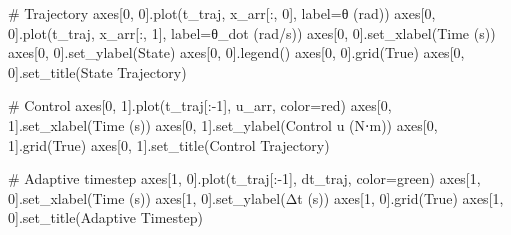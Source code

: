 \documentclass[
  letterpaper,
  DIV=11,
  numbers=noendperiod]{scrartcl}
\newenvironment{Shaded}{\begin{snugshade}}{\end{snugshade}}
\newcommand{\CommentTok}[1]{\textcolor[rgb]{0.37,0.37,0.37}{#1}}
\newcommand{\DecValTok}[1]{\textcolor[rgb]{0.68,0.00,0.00}{#1}}
\newcommand{\NormalTok}[1]{\textcolor[rgb]{0.00,0.23,0.31}{#1}}
\newcommand{\OperatorTok}[1]{\textcolor[rgb]{0.37,0.37,0.37}{#1}}
\newcommand{\StringTok}[1]{\textcolor[rgb]{0.13,0.47,0.30}{#1}}
\newcommand{\VariableTok}[1]{\textcolor[rgb]{0.07,0.07,0.07}{#1}}
\begin{document}
\begin{Shaded}
\begin{Highlighting}[]
    \CommentTok{\# Trajectory}
\NormalTok{    axes[}\DecValTok{0}\NormalTok{, }\DecValTok{0}\NormalTok{].plot(t\_traj, x\_arr[:, }\DecValTok{0}\NormalTok{], label}\OperatorTok{=}\StringTok{\textquotesingle{}θ (rad)\textquotesingle{}}\NormalTok{)}
\NormalTok{    axes[}\DecValTok{0}\NormalTok{, }\DecValTok{0}\NormalTok{].plot(t\_traj, x\_arr[:, }\DecValTok{1}\NormalTok{], label}\OperatorTok{=}\StringTok{\textquotesingle{}θ\_dot (rad/s)\textquotesingle{}}\NormalTok{)}
\NormalTok{    axes[}\DecValTok{0}\NormalTok{, }\DecValTok{0}\NormalTok{].set\_xlabel(}\StringTok{\textquotesingle{}Time (s)\textquotesingle{}}\NormalTok{)}
\NormalTok{    axes[}\DecValTok{0}\NormalTok{, }\DecValTok{0}\NormalTok{].set\_ylabel(}\StringTok{\textquotesingle{}State\textquotesingle{}}\NormalTok{)}
\NormalTok{    axes[}\DecValTok{0}\NormalTok{, }\DecValTok{0}\NormalTok{].legend()}
\NormalTok{    axes[}\DecValTok{0}\NormalTok{, }\DecValTok{0}\NormalTok{].grid(}\VariableTok{True}\NormalTok{)}
\NormalTok{    axes[}\DecValTok{0}\NormalTok{, }\DecValTok{0}\NormalTok{].set\_title(}\StringTok{\textquotesingle{}State Trajectory\textquotesingle{}}\NormalTok{)}

    \CommentTok{\# Control}
\NormalTok{    axes[}\DecValTok{0}\NormalTok{, }\DecValTok{1}\NormalTok{].plot(t\_traj[:}\OperatorTok{{-}}\DecValTok{1}\NormalTok{], u\_arr, color}\OperatorTok{=}\StringTok{\textquotesingle{}red\textquotesingle{}}\NormalTok{)}
\NormalTok{    axes[}\DecValTok{0}\NormalTok{, }\DecValTok{1}\NormalTok{].set\_xlabel(}\StringTok{\textquotesingle{}Time (s)\textquotesingle{}}\NormalTok{)}
\NormalTok{    axes[}\DecValTok{0}\NormalTok{, }\DecValTok{1}\NormalTok{].set\_ylabel(}\StringTok{\textquotesingle{}Control u (N⋅m)\textquotesingle{}}\NormalTok{)}
\NormalTok{    axes[}\DecValTok{0}\NormalTok{, }\DecValTok{1}\NormalTok{].grid(}\VariableTok{True}\NormalTok{)}
\NormalTok{    axes[}\DecValTok{0}\NormalTok{, }\DecValTok{1}\NormalTok{].set\_title(}\StringTok{\textquotesingle{}Control Trajectory\textquotesingle{}}\NormalTok{)}

    \CommentTok{\# Adaptive timestep}
\NormalTok{    axes[}\DecValTok{1}\NormalTok{, }\DecValTok{0}\NormalTok{].plot(t\_traj[:}\OperatorTok{{-}}\DecValTok{1}\NormalTok{], dt\_traj, color}\OperatorTok{=}\StringTok{\textquotesingle{}green\textquotesingle{}}\NormalTok{)}
\NormalTok{    axes[}\DecValTok{1}\NormalTok{, }\DecValTok{0}\NormalTok{].set\_xlabel(}\StringTok{\textquotesingle{}Time (s)\textquotesingle{}}\NormalTok{)}
\NormalTok{    axes[}\DecValTok{1}\NormalTok{, }\DecValTok{0}\NormalTok{].set\_ylabel(}\StringTok{\textquotesingle{}Δt (s)\textquotesingle{}}\NormalTok{)}
\NormalTok{    axes[}\DecValTok{1}\NormalTok{, }\DecValTok{0}\NormalTok{].grid(}\VariableTok{True}\NormalTok{)}
\NormalTok{    axes[}\DecValTok{1}\NormalTok{, }\DecValTok{0}\NormalTok{].set\_title(}\StringTok{\textquotesingle{}Adaptive Timestep\textquotesingle{}}\NormalTok{)}


\end{Highlighting}
\end{Shaded}
\end{document}
